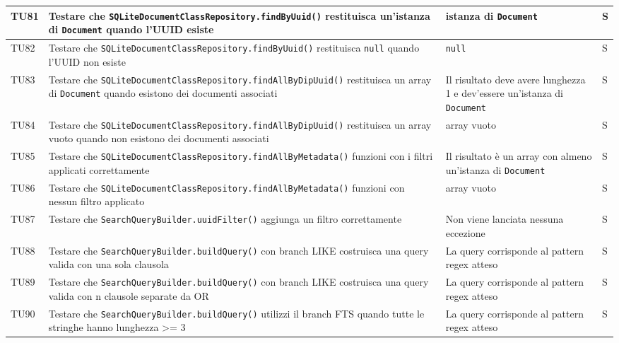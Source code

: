 \documentclass[a4paper,12pt]{article}
\begin{document}
\begin{longtable}{|M{1.2cm}|M{5cm}|M{5cm}|M{1.5cm}|}
            TU81 & Testare che \texttt{SQLiteDocumentClassRepository.findByUuid()} restituisca un'istanza di \texttt{Document} quando l'UUID esiste & istanza di \texttt{Document} & S \\
            \hline

            TU82 & Testare che \texttt{SQLiteDocumentClassRepository.findByUuid()} restituisca \texttt{null} quando l'UUID non esiste & \texttt{null} & S \\
            \hline

            TU83 & Testare che \texttt{SQLiteDocumentClassRepository.findAllByDipUuid()} restituisca un array di \texttt{Document} quando esistono dei documenti associati & Il risultato deve avere lunghezza 1 e dev'essere un'istanza di \texttt{Document} & S \\
            \hline

            TU84 & Testare che \texttt{SQLiteDocumentClassRepository.findAllByDipUuid()} restituisca un array vuoto quando non esistono dei documenti associati & array vuoto & S \\
            \hline

            TU85 & Testare che \texttt{SQLiteDocumentClassRepository.findAllByMetadata()} funzioni con i filtri applicati correttamente & Il risultato è un array con almeno un'istanza di \texttt{Document} & S \\
            \hline

            TU86 & Testare che \texttt{SQLiteDocumentClassRepository.findAllByMetadata()} funzioni con nessun filtro applicato & array vuoto & S \\
            \hline

            TU87 & Testare che \texttt{SearchQueryBuilder.uuidFilter()} aggiunga un filtro correttamente & Non viene lanciata nessuna eccezione & S \\
            \hline

            TU88 & Testare che \texttt{SearchQueryBuilder.buildQuery()} con branch LIKE costruisca una query valida con una sola clausola & La query corrisponde al pattern regex atteso & S \\
            \hline

            TU89 & Testare che \texttt{SearchQueryBuilder.buildQuery()} con branch LIKE costruisca una query valida con n clausole separate da OR & La query corrisponde al pattern regex atteso & S \\
            \hline

            TU90 & Testare che \texttt{SearchQueryBuilder.buildQuery()} utilizzi il branch FTS quando tutte le stringhe hanno lunghezza >= 3 & La query corrisponde al pattern regex atteso & S \\
            \hline


\end{longtable}
\end{document}
